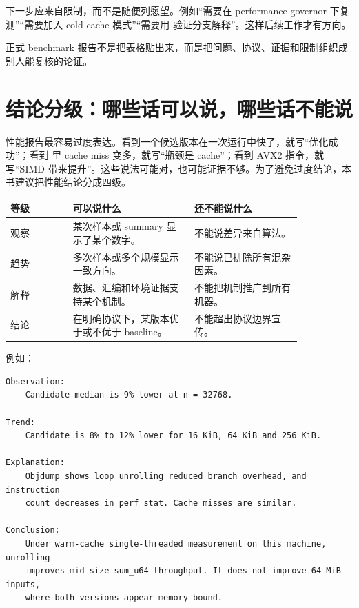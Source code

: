 下一步应来自限制，而不是随便列愿望。例如“需要在 performance governor 下复测”“需要加入 cold-cache 模式”“需要用  验证分支解释”。这样后续工作才有方向。

\begin{keyidea}
正式 benchmark 报告不是把表格贴出来，而是把问题、协议、证据和限制组织成别人能复核的论证。
\end{keyidea}

\section{结论分级：哪些话可以说，哪些话不能说}

性能报告最容易过度表达。看到一个候选版本在一次运行中快了，就写“优化成功”；看到  里 cache miss 变多，就写“瓶颈是 cache”；看到 AVX2 指令，就写“SIMD 带来提升”。这些说法可能对，也可能证据不够。为了避免过度结论，本书建议把性能结论分成四级。

\begin{center}
\begin{tabular}{p{0.18\linewidth}p{0.35\linewidth}p{0.31\linewidth}}
\toprule
等级 & 可以说什么 & 还不能说什么 \\
\midrule
观察 & 某次样本或 summary 显示了某个数字。 & 不能说差异来自算法。 \\
趋势 & 多次样本或多个规模显示一致方向。 & 不能说已排除所有混杂因素。 \\
解释 & 数据、汇编和环境证据支持某个机制。 & 不能把机制推广到所有机器。 \\
结论 & 在明确协议下，某版本优于或不优于 baseline。 & 不能超出协议边界宣传。 \\
\bottomrule
\end{tabular}
\end{center}

例如：

\begin{lstlisting}
Observation:
    Candidate median is 9% lower at n = 32768.

Trend:
    Candidate is 8% to 12% lower for 16 KiB, 64 KiB and 256 KiB.

Explanation:
    Objdump shows loop unrolling reduced branch overhead, and instruction
    count decreases in perf stat. Cache misses are similar.

Conclusion:
    Under warm-cache single-threaded measurement on this machine, unrolling
    improves mid-size sum_u64 throughput. It does not improve 64 MiB inputs,
    where both versions appear memory-bound.
\end{lstlisting}

